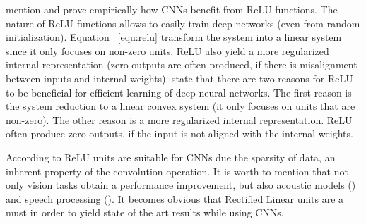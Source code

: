 \textcite{zeiler2013rectified} mention and prove empirically how CNNs benefit from ReLU functions. The nature of ReLU functions allows to easily train deep networks (even from random initialization). Equation ~\ref{equ:relu} transform the system into a linear system since it only focuses on non-zero units. ReLU also yield a more regularized internal representation (zero-outputs are often produced, if there is misalignment between inputs and internal weights).   state that there are two reasons for ReLU to be beneficial for efficient learning of deep neural networks. The first reason is the system reduction to a linear convex system (it only focuses on units that are non-zero). The other reason is a more regularized internal representation. ReLU often produce zero-outputs, if the input is not aligned with the internal weights.

According to \textcite{glorot2011deep} ReLU units are suitable for CNNs due the sparsity of data, an inherent property of the convolution operation. It is worth to mention that not only vision tasks obtain a performance improvement, but also acoustic models (\textcite{maas2013rectifier}) and speech processing (\textcite{zeiler2013rectified}). It becomes obvious that Rectified Linear units are a must in order to yield state of the art results while using CNNs. 

